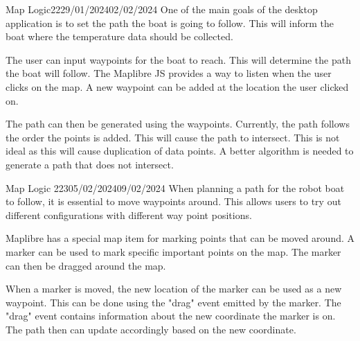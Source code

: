 \documentclass[12pt]{article}
\begin{document}
\begin{logbook-entry}{Map Logic}{22}{29/01/2024}{02/02/2024}
One of the main goals of the desktop application is to set the path the boat is going to follow.
This will inform the boat where the temperature data should be collected.

The user can input waypoints for the boat to reach.
This will determine the path the boat will follow.
The Maplibre JS provides a way to listen when the user clicks on the map.
A new waypoint can be added at the location the user clicked on.

The path can then be generated using the waypoints.
Currently, the path follows the order the points is added.
This will cause the path to intersect.
This is not ideal as this will cause duplication of data points.
A better algorithm is needed to generate a path that does not intersect.
\end{logbook-entry}

\begin{logbook-entry}{Map Logic 2}{23}{05/02/2024}{09/02/2024}
When planning a path for the robot boat to follow, it is essential to move waypoints around.
This allows users to try out different configurations with different way point positions.

Maplibre has a special map item for marking points that can be moved around.
A marker can be used to mark specific important points on the map.
The marker can then be dragged around the map.

When a marker is moved, the new location of the marker can be used as a new waypoint.
This can be done using the "drag" event emitted by the marker.
The "drag" event contains information about the new coordinate the marker is on.
The path then can update accordingly based on the new coordinate.
\end{logbook-entry}
\end{document}
